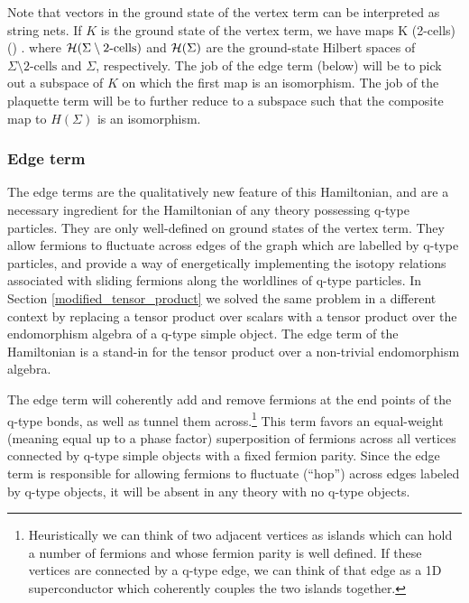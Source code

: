 Note that vectors in the ground state of the vertex term can be interpreted as string nets.
If $K$ is the ground state of the vertex term, we have maps
\be
	K \to \mch(\Sigma \setminus \mbox{2-cells}) \to \mch(\Sigma) .
	\label{ground_state_projection}
\ee
where $\mathcal{H}(\Sigma \setminus \mbox{2-cells})$ and $\mathcal{H}(\Sigma)$ are the ground-state Hilbert spaces of $\Sigma \setminus \mbox{2-cells}$ and $\Sigma$, respectively.
The job of the edge term (below) will be to pick out a subspace of $K$ on which the first map is an isomorphism. 
The job of the plaquette term will be to further reduce to a subspace such that the composite map to $H(\Sigma)$ is an isomorphism.




\subsubsection{Edge term} 
\label{edge_term}

The edge terms are the qualitatively new feature of this Hamiltonian, and are a necessary ingredient for the Hamiltonian of any theory possessing q-type particles. 
They are only well-defined on ground states of the vertex term. 
They allow fermions to fluctuate across edges of the graph which are labelled by q-type particles,
and provide a way of energetically implementing the isotopy relations associated with sliding fermions along the worldlines of q-type particles. 
In Section \ref{modified_tensor_product} we solved the same problem in
a different context by replacing a tensor product over scalars with a tensor product
over the endomorphism algebra of a q-type simple object.
The edge term of the Hamiltonian is a stand-in for the tensor product over a non-trivial endomorphism algebra.



The edge term will coherently add and remove fermions at the end points of the q-type bonds, as well as tunnel them across.\footnote{Heuristically we can think of two adjacent vertices as islands which can hold a number of fermions and whose fermion parity is well defined. 
If these vertices are connected by a q-type edge, we can think of that edge as a 1D superconductor which coherently couples the two islands together.}
This term favors an equal-weight (meaning equal up to a phase factor) 
superposition of fermions across all vertices connected by 
q-type simple objects with a fixed fermion parity.
Since the edge term is responsible for allowing fermions to fluctuate (``hop'') across edges labeled by q-type objects, 
it will be absent in any theory with no q-type objects.

